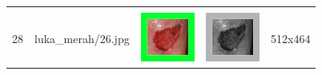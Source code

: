 \begin{table}[H]
\begin{tabular}{|m{0.2in}|m{1.2in}|m{0.7in}|m{0.7in}|m{0.7in}|}
		& &  &  &\\
		28& 
		luka\_merah/26.jpg &
		\includegraphics[width=0.7in]{dataset/dataset_3/luka_merah/ready/26.jpg}&
		\includegraphics[width=0.7in]{dataset/dataset_3/luka_merah/ready/26_gray.jpg}&
		512x464\\
		\hline
	\end{tabular}
\end{table}

